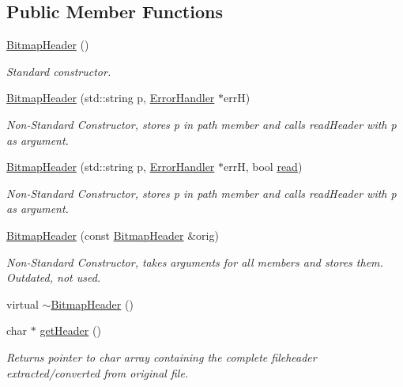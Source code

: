 \subsection*{Public Member Functions}
\begin{DoxyCompactItemize}
\item 
\mbox{\hyperlink{classBitmapHeader_a216e4a8485db7865be70c996f37e4c7d}{Bitmap\+Header}} ()
\begin{DoxyCompactList}\small\item\em Standard constructor. \end{DoxyCompactList}\item 
\mbox{\hyperlink{classBitmapHeader_a2cf57f049eae7d2ee93d5749d678aca5}{Bitmap\+Header}} (std\+::string p, \mbox{\hyperlink{classErrorHandler}{Error\+Handler}} $\ast$errH)
\begin{DoxyCompactList}\small\item\em Non-\/\+Standard Constructor, stores p in path member and calls read\+Header with p as argument. \end{DoxyCompactList}\item 
\mbox{\hyperlink{classBitmapHeader_aa0bf5c2238f213b36d7b85d4b7f90be1}{Bitmap\+Header}} (std\+::string p, \mbox{\hyperlink{classErrorHandler}{Error\+Handler}} $\ast$errH, bool \mbox{\hyperlink{classBitmapHeader_aebc19bf8a908f1f7edfc5b10186c9db8}{read}})
\begin{DoxyCompactList}\small\item\em Non-\/\+Standard Constructor, stores p in path member and calls read\+Header with p as argument. \end{DoxyCompactList}\item 
\mbox{\hyperlink{classBitmapHeader_a25a5481f49d70a8c42a9efc17f17fd48}{Bitmap\+Header}} (const \mbox{\hyperlink{classBitmapHeader}{Bitmap\+Header}} \&orig)
\begin{DoxyCompactList}\small\item\em Non-\/\+Standard Constructor, takes arguments for all members and stores them. Outdated, not used. \end{DoxyCompactList}\item 
virtual \mbox{\hyperlink{classBitmapHeader_a4e102d5fe9a8619fca7319b148ec23d1}{$\sim$\+Bitmap\+Header}} ()
\item 
char $\ast$ \mbox{\hyperlink{classBitmapHeader_aa29e1acc8a7a588867039d7c0bdcde04}{get\+Header}} ()
\begin{DoxyCompactList}\small\item\em Returns pointer to char array containing the complete fileheader extracted/converted from original file. \end{DoxyCompactList}\item 

\end{DoxyCompactItemize}
